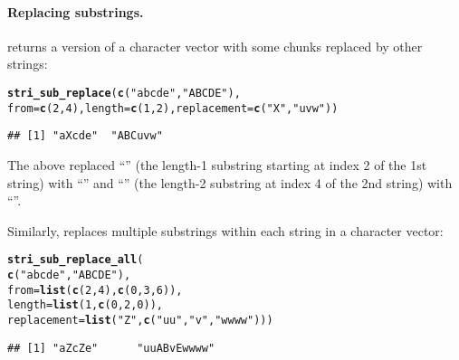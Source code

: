 \documentclass[nojss]{jss}\usepackage[]{graphicx}\usepackage[]{xcolor}
\makeatletter
\newcommand{\hlnum}[1]{\textcolor[rgb]{0.686,0.059,0.569}{#1}}%
\newcommand{\hlstr}[1]{\textcolor[rgb]{0.192,0.494,0.8}{#1}}%
\newcommand{\hlstd}[1]{\textcolor[rgb]{0.345,0.345,0.345}{#1}}%
\newcommand{\hlkwc}[1]{\textcolor[rgb]{0.333,0.667,0.333}{#1}}%
\newcommand{\hlkwd}[1]{\textcolor[rgb]{0.737,0.353,0.396}{\textbf{#1}}}%
\newenvironment{kframe}{%
 \def\at@end@of@kframe{}%
 \ifinner\ifhmode%
  \def\at@end@of@kframe{\end{minipage}}%
  \begin{minipage}{\columnwidth}%
 \fi\fi%
 \def\FrameCommand##1{\hskip\@totalleftmargin \hskip-\fboxsep
 \colorbox{shadecolor}{##1}\hskip-\fboxsep
     \hskip-\linewidth \hskip-\@totalleftmargin \hskip\columnwidth}%
 \MakeFramed {\advance\hsize-\width
   \@totalleftmargin\z@ \linewidth\hsize
   \@setminipage}}%
 {\par\unskip\endMakeFramed%
 \at@end@of@kframe}
\newenvironment{knitrout}{}{} %
\makeatother
\begin{document}
\paragraph{Replacing substrings.}
 returns a version
of a character vector with some chunks replaced by other
strings:

\begin{knitrout}
\color{fgcolor}\begin{kframe}
\begin{alltt}
\hlkwd{stri_sub_replace}\hlstd{(}\hlkwd{c}\hlstd{(}\hlstr{"abcde"}\hlstd{,} \hlstr{"ABCDE"}\hlstd{),}
  \hlkwc{from}\hlstd{=}\hlkwd{c}\hlstd{(}\hlnum{2}\hlstd{,} \hlnum{4}\hlstd{),} \hlkwc{length}\hlstd{=}\hlkwd{c}\hlstd{(}\hlnum{1}\hlstd{,} \hlnum{2}\hlstd{),} \hlkwc{replacement}\hlstd{=}\hlkwd{c}\hlstd{(}\hlstr{"X"}\hlstd{,} \hlstr{"uvw"}\hlstd{))}
\end{alltt}
\begin{verbatim}
## [1] "aXcde"  "ABCuvw"
\end{verbatim}
\end{kframe}
\end{knitrout}

\noindent
The above replaced ``'' (the length-1 substring
starting at index 2 of the 1st string) with ``''
and ``''
(the length-2 substring at index 4 of the 2nd string)
with ``''.


Similarly,  replaces
multiple substrings within each string in a character vector:

\begin{knitrout}
\color{fgcolor}\begin{kframe}
\begin{alltt}
\hlkwd{stri_sub_replace_all}\hlstd{(}
                   \hlkwd{c}\hlstd{(}\hlstr{"abcde"}\hlstd{,}  \hlstr{"ABCDE"}\hlstd{),}
  \hlkwc{from}        \hlstd{=} \hlkwd{list}\hlstd{(}\hlkwd{c}\hlstd{(}\hlnum{2}\hlstd{,} \hlnum{4}\hlstd{),}  \hlkwd{c}\hlstd{(}\hlnum{0}\hlstd{,}    \hlnum{3}\hlstd{,}   \hlnum{6}\hlstd{)),}
  \hlkwc{length}      \hlstd{=} \hlkwd{list}\hlstd{(}  \hlnum{1}\hlstd{,}      \hlkwd{c}\hlstd{(}\hlnum{0}\hlstd{,}    \hlnum{2}\hlstd{,}   \hlnum{0}\hlstd{)),}
  \hlkwc{replacement} \hlstd{=} \hlkwd{list}\hlstd{(}  \hlstr{"Z"}\hlstd{,}    \hlkwd{c}\hlstd{(}\hlstr{"uu"}\hlstd{,} \hlstr{"v"}\hlstd{,} \hlstr{"wwww"}\hlstd{)))}
\end{alltt}
\begin{verbatim}
## [1] "aZcZe"      "uuABvEwwww"
\end{verbatim}
\end{kframe}
\end{knitrout}
\end{document}
